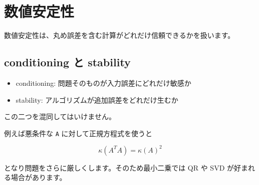 \documentclass[
  11pt,
  a4paper,
]{ltjsarticle}
\author{}
\date{}
\providecommand{\tightlist}{%
  \setlength{\itemsep}{0pt}\setlength{\parskip}{0pt}}
\begin{document}
\hypertarget{ux6570ux5024ux5b89ux5b9aux6027}{%
\section{数値安定性}\label{ux6570ux5024ux5b89ux5b9aux6027}}

数値安定性は、丸め誤差を含む計算がどれだけ信頼できるかを扱います。

\hypertarget{conditioning-ux3068-stability}{%
\subsection{conditioning と
stability}\label{conditioning-ux3068-stability}}

\begin{itemize}
\tightlist
\item
  conditioning: 問題そのものが入力誤差にどれだけ敏感か
\item
  stability: アルゴリズムが追加誤差をどれだけ生むか
\end{itemize}

この二つを混同してはいけません。

例えば悪条件な \texttt{A} に対して正規方程式を使うと

\[
\kappa(A^TA)=\kappa(A)^2
\]

となり問題をさらに厳しくします。そのため最小二乗では QR や SVD
が好まれる場合があります。
\end{document}
